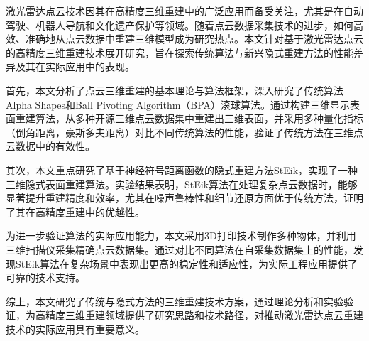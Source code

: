 激光雷达点云技术因其在高精度三维重建中的广泛应用而备受关注，尤其是在自动驾驶、机器人导航和文化遗产保护等领域。随着点云数据采集技术的进步，如何高效、准确地从点云数据中重建三维模型成为研究热点。本文针对基于激光雷达点云的高精度三维重建技术展开研究，旨在探索传统算法与新兴隐式重建方法的性能差异及其在实际应用中的表现。

首先，本文分析了点云三维重建的基本理论与算法框架，深入研究了传统算法Alpha Shapes和Ball Pivoting Algorithm（BPA）滚球算法。通过构建三维显示表面重建算法，从多种开源三维点云数据集中重建出三维表面，并采用多种量化指标（倒角距离，豪斯多夫距离）对比不同传统算法的性能，验证了传统方法在三维点云数据中的有效性。

其次，本文重点研究了基于神经符号距离函数的隐式重建方法StEik，实现了一种三维隐式表面重建算法。实验结果表明，StEik算法在处理复杂点云数据时，能够显著提升重建精度和效率，尤其在噪声鲁棒性和细节还原方面优于传统方法，证明了其在高精度重建中的优越性。

为进一步验证算法的实际应用能力，本文采用3D打印技术制作多种物体，并利用三维扫描仪采集精确点云数据集。通过对比不同算法在自采集数据集上的性能，发现StEik算法在复杂场景中表现出更高的稳定性和适应性，为实际工程应用提供了可靠的技术支持。

综上，本文研究了传统与隐式方法的三维重建技术方案，通过理论分析和实验验证，为高精度三维重建领域提供了研究思路和技术路径，对推动激光雷达点云重建技术的实际应用具有重要意义。
